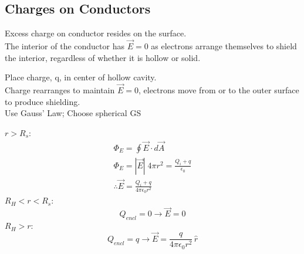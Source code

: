 \documentclass[a4paper, 11pt, fleqn, normalem]{report}
\begin{document}
\section{Charges on Conductors}
Excess charge on conductor resides on the surface. \\
The interior of the conductor has $\vec{E} = 0$ as electrons arrange themselves to shield the interior, regardless of whether it is hollow or solid.

Place charge, q, in center of hollow cavity. \\
Charge rearranges to maintain $\vec{E} = 0$, electrons move from or to the outer surface to produce shielding. \\
Use Gauss' Law; Choose spherical GS

$r > R_{s}$:
\begin{gather*}
    \Phi_{E} = \oint \vec{E} \cdot d\vec{A} \\
    \Phi_{E} = |\vec{E}| \; 4\pi r^{2}= \frac{Q_{i} + q}{\epsilon_{0}} \\
    \therefore \vec{E} = \frac{Q_{i} + q}{4\pi \epsilon_{0} r^{2} }
\end{gather*}
$R_{H} < r < R_{s}$:
\begin{equation*}
    Q_{encl} = 0 \to \vec{E} = 0
\end{equation*}
$R_{H} > r$:
\begin{equation*}
    Q_{encl} = q \to \vec{E} = \frac{q}{4\pi \epsilon_{0} r^{2}} \, \hat{r}
\end{equation*}

\chapter{}
\end{document}
